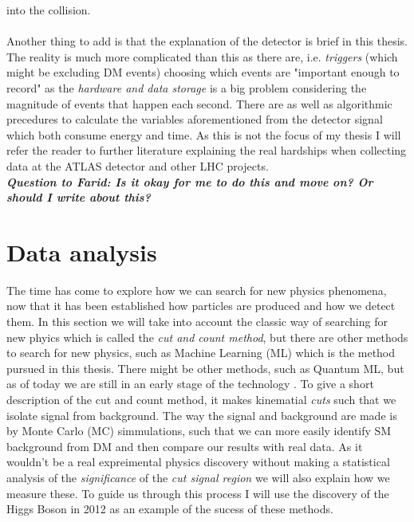 \documentclass[14pt, a4paper]{book}
\begin{document}
into the collision. \\
\\Another thing to add is that the explanation of the detector is brief in this thesis. The reality is much more complicated than this as there are, i.e. \textit{triggers} (which might be excluding DM events) choosing which events are 
"important enough to record" as the \textit{hardware and data storage} is a big problem considering the magnitude of events that happen each second. There are as well as algorithmic precedures to calculate the variables aforementioned from the detector signal 
which both consume energy and time. As this is not the focus of my thesis I will refer the reader to further literature explaining the real hardships when collecting data at the ATLAS detector and other LHC projects. \\
\textit{\textbf{Question to Farid: Is it okay for me to do this and move on? Or should I write about this?}}





\clearpage
\section{Data analysis}
The time has come to explore how we can search for new physics phenomena, now that it has been established how particles are produced and how we detect them. In this section we will take into account the classic way of searching for new phyics which is called 
the \textit{cut and count method}, but there are other methods to search for new physics, such as Machine Learning (ML) which is the method pursued in this thesis. There might be other methods, such as 
Quantum ML, but as of today we are still in an early stage of the technology \cite{QML} . To give a short description of the cut and count method, it makes kinematial \textit{cuts} such that we isolate signal from background. The way 
the signal and background are made is by Monte Carlo (MC) simmulations, such that we can more easily identify SM background from DM and then compare our results with real data. As it wouldn't be a real expreimental physics discovery without making a statistical 
analysis of the \textit{significance} of the \textit{cut signal region} we will also explain how we measure these. To guide us through this process I will use the discovery of the Higgs Boson in 2012 \cite{Higgs_discovery_2012} as an example of the sucess of these methods.
\end{document}
